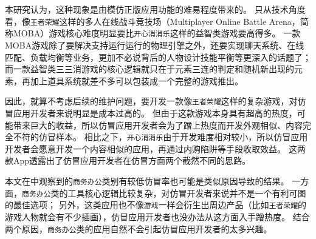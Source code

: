本研究认为，这种现象是由模仿正版应用功能的难易程度带来的。
只从技术角度看，像\texttt{王者荣耀}这样的多人在线战斗竞技场（Multiplayer Online Battle Arena，简称MOBA）游戏核心难度明显要比\texttt{开心消消乐}这样的益智类游戏要高得多。
一款MOBA游戏除了要解决支持运行运行的物理引擎之外，还要实现聊天系统、在线匹配、负载均衡等业务，更加不必说背后的人物设计技能平衡等更深入的话题了；而一款益智类三三消游戏的核心逻辑就只在于元素三连的判定和随机新出现的元素，再加上道具系统就差不多可以包装成一个完整的游戏推出。

因此，就算不考虑后续的维护问题，要开发一款像\texttt{王者荣耀}这样的复杂游戏，对仿冒应用开发者来说明显是成本过高的。
但由于这款游戏本身具有超高的热度，可能带来巨大的收益，所以仿冒应用开发者会为了蹭上热度而开发外观相似、内容完全不符的仿冒样本。
相比之下，\texttt{开心消消乐}由于开发难度相对较小，所以仿冒应用开发者会愿意开发一个内容相似的应用，再通过内购陷阱等手段收取效益。
这两款App透露出了仿冒应用开发者在仿冒方面两个截然不同的思路。

本文在中观察到的\texttt{商务办公}类别有较低仿冒率也可能是类似原因导致的结果。
一方面，\texttt{商务办公}类的工具核心逻辑比较复杂，对仿冒开发者来说并不是一个有利可图的最佳选项；
另外，这类应用也不像\texttt{游戏}一样会衍生出周边产品（比如\texttt{王者荣耀}的游戏人物就会有不少插画），仿冒应用开发者也没办法从这方面入手蹭热度。
结合两个原因，\texttt{商务办公}类的应用自然不会引起仿冒应用开发者的太多兴趣。


